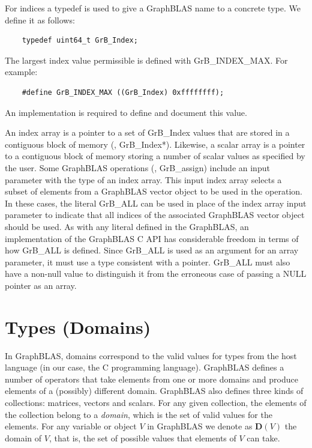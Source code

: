 For indices a {\sf typedef} is used to give a GraphBLAS name to a concrete type. We define it as follows:
\begin{verbatim}
    typedef uint64_t GrB_Index;
\end{verbatim}
The largest index value permissible is defined with {\sf GrB\_INDEX\_MAX}. For example:
\begin{verbatim}
    #define GrB_INDEX_MAX ((GrB_Index) 0xffffffff);
\end{verbatim}
An implementation is required to define and document this value.

An index array is a pointer to a set of {\sf GrB\_Index} values that are 
stored in a contiguous block of memory (\ie, {\sf GrB\_Index*}).
Likewise, a scalar array is a pointer to a contiguous block of memory 
storing a number of scalar values as specified by the user.
Some GraphBLAS operations (\eg, {\sf GrB\_assign})  include an input parameter with the type of an index array. 
This input index array selects a subset of elements from a GraphBLAS vector object to be used in the operation.
In these cases, the literal {\sf GrB\_ALL} 
can be used in place of the index array input parameter to indicate that all indices 
of the associated GraphBLAS vector object should be used.
As with any literal defined in the GraphBLAS, an implementation of the GraphBLAS C API has considerable 
freedom in terms of how {\sf GrB\_ALL} is defined.  Since {\sf GrB\_ALL} is used as an argument for an array 
parameter, it must use a type consistent with a pointer. {\sf GrB\_ALL} must also have a non-null
value to distinguish it from the erroneous case of passing a {\sf NULL} pointer as an array.

\section{Types (Domains)}
\label{Sec:Domains}

In GraphBLAS, domains correspond to the valid values for types from the
host language (in our case, the C programming language).  GraphBLAS defines
a number of operators that take elements from one or more domains and produce elements of a (possibly) different domain.  GraphBLAS also defines 
three kinds of collections: matrices, vectors and scalars.  For any given 
collection, the elements of the collection belong to a \emph{domain}, which 
is the set of valid values for the elements.  For any variable 
or object $V$ in GraphBLAS we denote as $\mathbf{D}(V)$ the domain of $V$,
that is, the set of possible values that elements of $V$ can take.  

